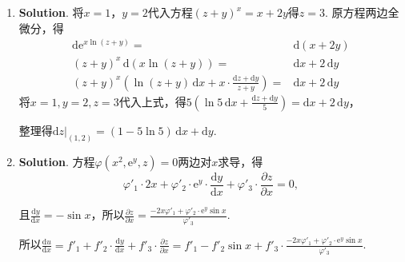 \documentclass[../Main.tex]{subfiles}
\begin{document}
\begin{enumerate}
          切线的方程为$\frac{x-3}{4}=\frac{y-4}{-3}=\frac{z-5}{0}$，

          法平面的方程为$4\cdot(x-3)-3\cdot(y-4)+0\cdot(z-5)=0$，即$4x-3y=0$.

    \item \textbf{Solution}. 将$x=1$，$y=2$代入方程$(z+y)^{x} = x+2y$得$z=3$. 原方程两边全微分，得
          \[
              \begin{aligned}
                  \mathrm{d}\mathrm{e}^{x\ln(z+y)}=                                                                   & \mathrm{d}(x+2y)           \\
                  \left(z+y\right)^{x}\,\mathrm{d}\left(x\ln(z+y)\right) =                                            & \mathrm{d}x+2\,\mathrm{d}y \\
                  \left(z+y\right)^{x}\left(\ln(z+y)\,\mathrm{d}x+x\cdot \frac{\mathrm{d}z+\mathrm{d}y}{z+y}\right) = & \mathrm{d}x+2\,\mathrm{d}y
              \end{aligned}
          \]
          将$x=1,y=2,z=3$代入上式，得$5\left(\ln 5\,\mathrm{d}x+\frac{\mathrm{d}z+\mathrm{d}y}{5}
              \right)=\mathrm{d}x+2\,\mathrm{d}y$，

          整理得$\left.\mathrm{d}z\right|_{(1,2)}= \left(1-5\ln 5\right)\,\mathrm{d}x +
              \mathrm{d}y$.

    \item \textbf{Solution}. 方程$\varphi\left(x^{2},\mathrm{e}^{y},z\right)=0$两边对$x$求导，得
          \[
              \varphi'_{1}\cdot 2x + \varphi'_{2}\cdot \mathrm{e}^{y}\cdot \frac{\mathrm{d}y}{\mathrm{d}x}
              + \varphi'_{3}\cdot \frac{\partial z}{\partial x}= 0,
          \]

          且$\frac{\mathrm{d}y}{\mathrm{d}x}=-\sin x$，所以$\frac{\partial z}{\partial
                  x}= \frac{-2x\varphi'_{1}+\varphi'_{2}\cdot \mathrm{e}^{y}\sin x}{\varphi'_{3}}$.

          所以$\frac{\mathrm{d}u}{\mathrm{d}x}=f'_{1}+f'_{2}\cdot \frac{\mathrm{d}y}{\mathrm{d}x}
              +f'_{3}\cdot \frac{\partial z}{\partial x}= f'_{1} - f'_{2}\sin x + f'_{3}\cdot
              \frac{-2x\varphi'_{1}+\varphi'_{2}\cdot \mathrm{e}^{y}\sin x}{\varphi'_{3}}$.


\end{enumerate}
\end{document}
